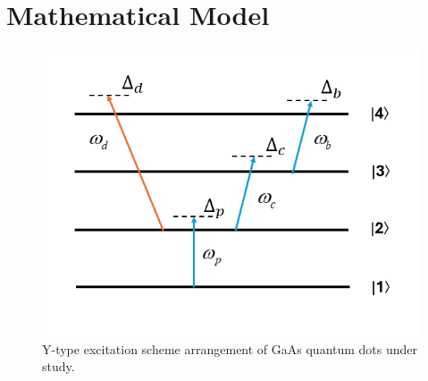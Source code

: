 \documentclass[12pt,a4paper]{article}
\begin{document}
\section{Mathematical Model}
\begin{figure}[h]
    \centering
    \includegraphics[width=0.6\linewidth]{pictures/Y-type.png}
    \caption{Y-type excitation scheme arrangement of GaAs quantum dots under study.}
    \label{fig:Y-type Excitation Scheme}
\end{figure}
\end{document}
